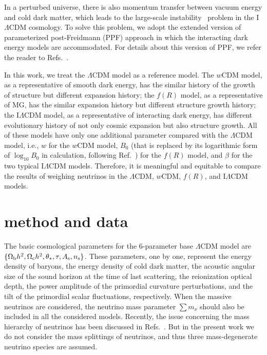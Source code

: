 \documentclass[aps,prd,nofootinbib,amsmath,amssymb,twocolumn,superscriptaddress,10pt]{revtex4}%
\begin{document}
In a perturbed universe, there is also momentum transfer between vacuum energy and cold dark matter, which leads to the large-scale instability~\cite{Valiviita:2008iv} problem in the I$\Lambda$CDM cosmology. To solve this problem, we adopt the extended version of parameterized post-Freidmann (PPF) approach in which the interacting dark energy models are accommodated. For details about this version of PPF, we refer the reader to Refs.~\cite{Li:2014eha,Li:2014cee,Li:2015vla,Zhang:2017ize,Guo:2017hea,Feng:2017usu,Guo:2018gyo,Feng:2018yew}.



In this work, {we treat the $\Lambda$CDM model as a reference model. The $w$CDM model, as a representative of smooth dark energy, has the similar history of the growth of structure but different expansion history; the $f(R)$ model, as a representative of MG, has the similar expansion history but different structure growth history; the I$\Lambda$CDM model, as a representative of interacting dark energy, has different evolutionary history of not only cosmic expansion but also structure growth. All of these models have only one additional parameter compared with the $\Lambda$CDM model, i.e., $w$ for the $w$CDM model, $B_0$ (that is replaced by its logarithmic form of $\log_{10}B_{0}$ in calculation, following Ref.~\cite{Dossett:2014oia}) for the $f(R)$ model, and $\beta$ for the two typical I$\Lambda$CDM models. Therefore, it is meaningful and equitable to compare the results of weighing neutrinos in the $\Lambda$CDM, $w$CDM, $f(R)$, and I$\Lambda$CDM models.}





\section{method and data}\label{data}


The basic cosmological parameters for the 6-parameter {base} $\Lambda$CDM model are $\{{\Omega_{\rm b}h^{2},\Omega_{\rm c}h^{2},\theta_\ast,\tau,A_{\rm s},n_{\rm s}}\}$. These parameters, one by one, represent the energy density of baryons, the energy density of cold dark matter, {the acoustic angular size of the sound horizon at the time of last scattering}, the reionization optical depth, {the power amplitude of the primordial curvature perturbations}, and the tilt of the primordial scalar fluctuations, {respectively}. When the massive neutrinos are considered, the neutrino mass parameter $\sum m_{\nu}$ should also be included in all {the considered} models. Recently, the issue concerning the mass hierarchy of neutrinos has been discussed in  Refs.~\cite{Huang:2015wrx,Wang:2016tsz,Guo:2018gyo,Zhao:2017jma}. But in the present work we do not consider the mass splittings of neutrinos, and thus three mass-degenerate neutrino species are assumed.
\end{document}
